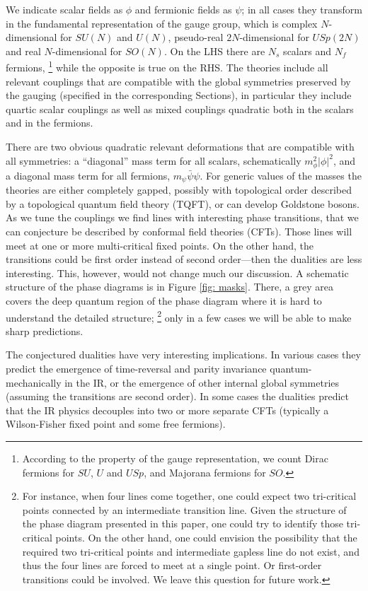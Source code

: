 \documentclass[a4paper, 12pt]{article}
\numberwithin{equation}{section}
\begin{document}
We indicate scalar fields as $\phi$ and fermionic fields as $\psi$; in all cases they transform in the fundamental representation of the gauge group, which is complex $N$-dimensional for $SU(N)$ and $U(N)$, pseudo-real $2N$-dimensional for $USp(2N)$ and real $N$-dimensional for $SO(N)$. On the LHS there are $N_s$ scalars and $N_f$ fermions,%
\footnote{According to the property of the gauge representation, we count Dirac fermions for $SU$, $U$ and $USp$, and Majorana fermions for $SO$.}
while the opposite is true on the RHS. The theories include all relevant couplings that are compatible with the global symmetries preserved by the gauging (specified in the corresponding Sections), in particular they include quartic scalar couplings as well as mixed couplings quadratic both in the scalars and in the fermions.

There are two obvious quadratic relevant deformations that are compatible with all symmetries: a ``diagonal'' mass term for all scalars, schematically $m_\phi^2 |\phi|^2$, and a diagonal mass term for all fermions, $m_\psi \bar\psi \psi$. For generic values of the masses the theories are either completely gapped, possibly with topological order described by a topological quantum field theory (TQFT), or can develop Goldstone bosons. As we tune the couplings we find lines with interesting phase transitions, that we can conjecture be described by conformal field theories (CFTs). Those lines will meet at one or more multi-critical fixed points. On the other hand, the transitions could be first order instead of second order---then the dualities are less interesting. This, however, would not change much our discussion. A schematic structure of the phase diagrams is in Figure \ref{fig: masks}. There, a grey area covers the deep quantum region of the phase diagram where it is hard to understand the detailed structure;%
\footnote{For instance, when four lines come together, one could expect two tri-critical points connected by an intermediate transition line. Given the structure of the phase diagram presented in this paper, one could try to identify those tri-critical points. On the other hand, one could envision the possibility that the required two tri-critical points and intermediate gapless line do not exist, and thus the four lines are forced to meet at a single point. Or first-order transitions could be involved. We leave this question for future work.}
only in a few cases we will be able to make sharp predictions.

The conjectured dualities have very interesting implications. In various cases they predict the emergence of time-reversal and parity invariance quantum-mechanically in the IR, or the emergence of other internal global symmetries (assuming the transitions are second order). In some cases the dualities predict that the IR physics decouples into two or more separate CFTs (typically a Wilson-Fisher fixed point and some free fermions).
\end{document}
